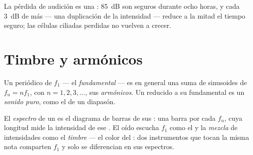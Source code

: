 \begin{remark}\label{rem:g12:sound-acoustics:damage}
La pérdida de audición es una : \qty{85}{dB} son seguros durante
ocho horas, y cada \qty{3}{dB} de más --- una duplicación de la
intensidad --- reduce a la mitad el tiempo seguro; las células ciliadas
perdidas no vuelven a crecer.
\end{remark}

\section{Timbre y armónicos}

\begin{definition}[Armónicos]\label{def:g12:sound-acoustics:harmonics}
Un  periódico de  $f_1$ --- el
\emph{fundamental} --- es en general una suma de
sinusoides de  $f_n = n f_1$, con $n = 1, 2, 3, \dots$, sus
\emph{armónicos}. Un  reducido a su fundamental es
un \emph{sonido puro}, como el de un diapasón.
\end{definition}

\begin{definition}\label{def:g12:sound-acoustics:timbre}
El \emph{espectro} de un  es el diagrama de barras
de sus : una barra por cada $f_n$, cuya longitud mide la
intensidad de ese . El oído escucha $f_1$ como el  y la
\emph{mezcla} de intensidades como el \emph{timbre} --- el
color del : dos instrumentos que tocan la misma nota comparten
$f_1$ y solo se diferencian en sus espectros.
\end{definition}

